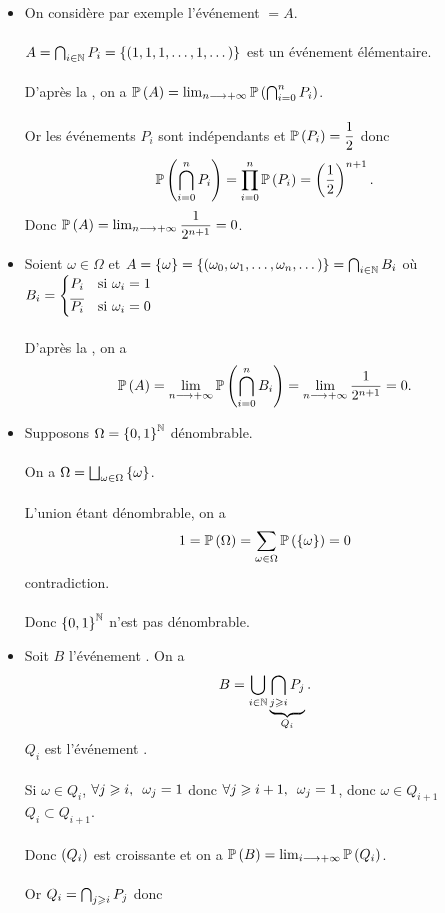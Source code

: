 \begin{corr}
\begin{itemize}
    \item On considère par exemple l'événement  \(=A\). \\\\ \(A=\bigcap_{i\in\mathbb{N}}P_i=\left\lbrace\left(1,1,1,\dots,1,\dots\right)\right\rbrace\) est un événement élémentaire. \\\\ D'après la , on a \(\mathbb{P}\left(A\right)=\lim_{n\longrightarrow+\infty}\mathbb{P}\left(\bigcap_{i=0}^nP_i\right)\). \\\\ Or les événements \(P_i\) sont indépendants et \(\mathbb{P}\left(P_i\right)=\dfrac{1}{2}\) donc \[\mathbb{P}\left(\bigcap_{i=0}^nP_i\right)=\prod_{i=0}^n\mathbb{P}\left(P_i\right)=\left(\dfrac{1}{2}\right)^{n+1}.\] Donc \(\mathbb{P}\left(A\right)=\lim_{n\longrightarrow+\infty}\dfrac{1}{2^{n+1}}=0\). \\
    \item Soient \(\omega\in\Omega\) et \(A=\left\lbrace\omega\right\rbrace=\left\lbrace\left(\omega_0,\omega_1,\dots,\omega_n,\dots\right)\right\rbrace=\bigcap_{i\in\mathbb{N}}B_i\) où \(B_i=\begin{dcases}
        P_i &\text{si }\omega_i=1 \\
        \overline{P_i} &\text{si }\omega_i=0
    \end{dcases}\) \\\\ D'après la , on a \[\mathbb{P}\left(A\right)=\lim_{n\longrightarrow+\infty}\mathbb{P}\left(\bigcap_{i=0}^nB_i\right)=\lim_{n\longrightarrow+\infty}\dfrac{1}{2^{n+1}}=0.\]
    \item Supposons \(\Omega=\left\lbrace0,1\right\rbrace^{\mathbb{N}}\) dénombrable. \\\\ On a \(\Omega=\bigsqcup_{\omega\in\Omega}\left\lbrace\omega\right\rbrace\). \\\\ L'union étant dénombrable, on a \[1=\mathbb{P}\left(\Omega\right)=\sum_{\omega\in\Omega}\mathbb{P}\left(\left\lbrace\omega\right\rbrace\right)=0\] contradiction. \\\\ Donc \(\left\lbrace0,1\right\rbrace^{\mathbb{N}}\) n'est pas dénombrable. \\
    \item Soit \(B\) l'événement . On a \[B=\bigcup_{i\in\mathbb{N}}\underbrace{\bigcap_{j\geqslant i}P_j}_{Q_i}.\] \(Q_i\) est l'événement . \\\\ Si \(\omega\in Q_i\), \(\quantifs{\forall j\geq i}\omega_j=1\) donc \(\quantifs{\forall j\geq i+1}\omega_j=1\), donc \(\omega\in Q_{i+1}\) \ie \(Q_i\subset Q_{i+1}\). \\\\ Donc \(\left(Q_i\right)\) est croissante et on a \(\mathbb{P}\left(B\right)=\lim_{i\longrightarrow+\infty}\mathbb{P}\left(Q_i\right)\). \\\\ Or \(Q_i=\bigcap_{j\geqslant i}P_j\) donc \[\begin{aligned}

\end{aligned}\]
\end{itemize}
\end{corr}
